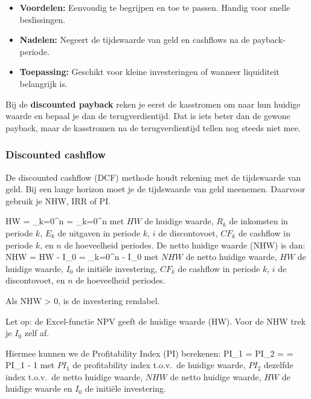 \documentclass[a4paper,11pt]{article}
\begin{document}
\begin{itemize}
    \item \textbf{Voordelen:} Eenvoudig te begrijpen en toe te passen. Handig voor snelle beslissingen.
    \item \textbf{Nadelen:} Negeert de tijdswaarde van geld en cashflows na de payback-periode.
    \item \textbf{Toepassing:} Geschikt voor kleine investeringen of wanneer liquiditeit belangrijk is.
\end{itemize}

Bij de \textbf{discounted payback} reken je eerst de kasstromen om naar hun huidige waarde en bepaal je dan de terugverdientijd.
Dat is iets beter dan de gewone payback, maar de kasstromen na de terugverdientijd tellen nog steeds niet mee.

\subsubsection{Discounted cashflow}
De discounted cashflow (DCF) methode houdt rekening met de tijdswaarde van geld.
Bij een lange horizon moet je de tijdswaarde van geld meenemen. Daarvoor gebruik je NHW, IRR of PI.

{
    HW = \sum_{k=0}^{n}  = \sum_{k=0}^{n} 
}
{met $HW$ de huidige waarde, $R_k$ de inkomsten in periode $k$, $E_k$ de uitgaven in periode $k$, $i$ de discontovoet, $CF_k$ de cashflow in periode $k$, en $n$ de hoeveelheid periodes.}
De netto huidige waarde (NHW) is dan:
{
    NHW = HW - I_0 = \sum_{k=0}^{n}  - I_0
}
{met $NHW$ de netto huidige waarde, $HW$ de huidige waarde, $I_0$ de initiële investering, $CF_k$ de cashflow in periode
    $k$, $i$ de discontovoet, en $n$ de hoeveelheid periodes.}

Als NHW > 0, is de investering rendabel.

Let op: de Excel-functie NPV geeft de huidige waarde (HW). Voor de NHW trek je $I_0$ zelf af.
\newline

Hiermee kunnen we de Profitability Index (PI) berekenen:
{
    PI_1 =  \qquad PI_2 =  = PI_1 - 1
}
{met $PI_1$ de profitability index t.o.v.\ de huidige waarde, $PI_2$ dezelfde index t.o.v.\ de netto huidige waarde,
    $NHW$ de netto huidige waarde, $HW$ de huidige waarde en $I_0$ de initiële investering.}
\end{document}
